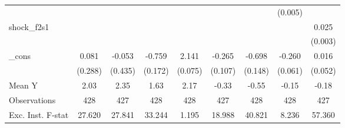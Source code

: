 {\begin{tabular}{l*{8}{c}}
            &                     &                     &                     &                     &                     &                     &     (0.005)         &                     \\
\addlinespace
shock\_f2s1  &                     &                     &                     &                     &                     &                     &                     &       0.025\sym{***}\\
            &                     &                     &                     &                     &                     &                     &                     &     (0.003)         \\
\addlinespace
\_cons      &       0.081         &      -0.053         &      -0.759\sym{***}&       2.141\sym{***}&      -0.265\sym{**} &      -0.698\sym{***}&      -0.260\sym{***}&       0.016         \\
            &     (0.288)         &     (0.435)         &     (0.172)         &     (0.075)         &     (0.107)         &     (0.148)         &     (0.061)         &     (0.052)         \\
\midrule
Mean Y      &        2.03         &        2.35         &        1.63         &        2.17         &       -0.33         &       -0.55         &       -0.15         &       -0.18         \\
Observations&         428         &         427         &         428         &         428         &         427         &         428         &         428         &         427         \\
Exc. Inst. F-stat&      27.620         &      27.841         &      33.244         &       1.195         &      18.988         &      40.821         &       8.236         &      57.360         \\
\bottomrule
\end{tabular}
}
